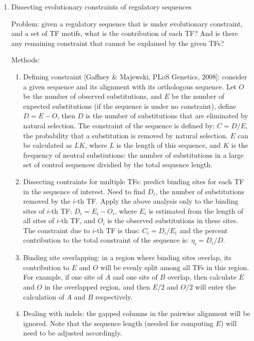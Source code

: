 \documentclass[11pt]{article}
\begin{document}
\begin{enumerate}
\begin{enumerate}
\end{enumerate}

\newpage

\item{Dissecting evolutionary constraints of regulatory sequences}

Problem: given a regulatory sequence that is under evolutionary constraint, and a set of TF motifs, what is the contribution of each TF? And is there any remaining constraint that cannot be explained by the given TFs? 

Methods: 
\begin{enumerate}
\item Defining constraint [Gaffney \& Majewski, PLoS Genetics, 2008]: consider a given sequence and its alignment with its orthologous sequence. Let $O$ be the number of observed substitutions, and $E$ be the number of expected substitutions (if the sequence is under no constraint), define $D = E - O$, then $D$ is the number of substitutions that are eliminated by natural selection. The constraint of the sequence is defined by: $C = D/E$, the probability that a substitution is removed by natural selection. $E$ can be calculated as $LK$, where $L$ is the length of this sequence, and $K$ is the frequency of neutral substiutions: the number of substitutions in a large set of control sequences dividied by the total sequence length. 

\item Dissecting contraints for multiple TFs: predict binding sites for each TF in the sequence of interest. Need to find $D_i$, the number of substitutions removed by the $i$-th TF. Apply the above analysis only to the binding sites of $i$-th TF: $D_i = E_i - O_i$, where $E_i$ is estimated from the length of all sites of $i$-th TF, and $O_i$ is the observed substitutions in these sites. The constraint due to $i$-th TF is thus: $C_i = D_i/E_i$ and the percent contribution to the total constraint of the sequence is: $\eta_i = D_i / D$.  

\item Binding site overlapping: in a region where binding sites overlap, its contribution to $E$ and $O$ will be evenly split among all TFs in this region. For example, if one site of $A$ and one site of $B$ overlap, then calculate $E$ and $O$ in the overlapped region, and then $E/2$ and $O/2$ will enter the calculation of $A$ and $B$ respectively. 

\item Dealing with indels: the gapped columns in the pairwise alignment will be ignored. Note that the sequence length (needed for computing $E$) will need to be adjusted accordingly. 


\end{enumerate}
\end{enumerate}
\end{document}
